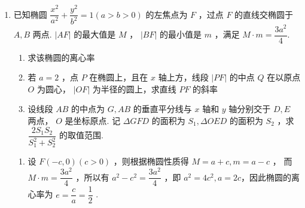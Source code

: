 \begin{enumerate}
\begin{enumerate}
\begin{jieda}
\begin{enumerate}
                以$OP$对$\bigtriangleup  {OGH}$分割可知$\dfrac{S_1}{S_2} = |x_1-x_2|$

                $\left\{\begin{array}{l}
                    y = k(x+1) \\
                    \dfrac{{x}^{2}}{9} + \dfrac{{y}^{2}}{8} = 1
                \end{array}\right.$，消元可得$8x^2+9k^2(x+1)^2 = 72$，即$(8+9k^2)x^2+18k^2x+9k^2-72 = 0$

                $\Delta > 0$，根据韦达定理有$\left\{\begin{array}{l}
                    x_1+x_2 = \dfrac{-18k^2}{8+9k^2} \\
                    x_1x_2 = \dfrac{9k^2-72}{8+9k^2}
                \end{array}\right.$
                
                $\dfrac{S_1}{S_2} = \dfrac{\sqrt{324k^4-4(9k^2-72)(8+9k^2)}}{8+9k^2} = \dfrac{48\sqrt{1+k^2}}{8+9k^2}$
                
                设$t = \sqrt{1+k^2}, t \in (1, 3)$，则$\dfrac{S_1}{S_2} = \dfrac{48t}{9t^2-1} = \dfrac{48}{9t - \dfrac{1}{t}} \in \left(\dfrac{9}{5}, 6\right)$
            \end{enumerate}
        \end{jieda}

        \item 已知椭圆 $\dfrac{x^2}{a^2} + \dfrac{y^2}{b^2} = 1(a > b > 0)$ 的左焦点为 $F$ ，过点 $F$ 的直线交椭圆于 $A,B$ 两点. $|AF|$ 的最大值是 $M$ ， $|BF|$ 的最小值是 $m$ ，满足 $M \cdot m = \dfrac{3a^2}{4}$.
        \begin{enumerate}
            \item 求该椭圆的离心率
            \item 若 $a = 2$ ，点 $P$ 在椭圆上，且在 $x$ 轴上方，线段 $|PF|$ 的中点 $Q$ 在以原点 $O$ 为圆心， $|OF|$ 为半径的圆上，求直线 $PF$ 的斜率
            \item 设线段 $AB$ 的中点为 $G,AB$ 的垂直平分线与 $x$ 轴和 $y$ 轴分别交于 $D,E$ 两点， $O$ 是坐标原点. 记 $\Delta GFD$ 的面积为 $S_1,\Delta OED$ 的面积为 $S_2$ ，求 $\dfrac{2S_{1}S_2}{S_1^2 + S_2^2}$ 的取值范围.
        \end{enumerate}
        \begin{jieda}
            \begin{enumerate}
                \item 设 $F(-c,0) (c > 0)$ ，则根据椭圆性质得 $M = a + c,m = a - c$ ， 而 $M \cdot m = \dfrac{3a^2}{4}$ ，所以有 $a^2 - c^2 = \dfrac{3a^2}{4}$ ，即 $a^2 = 4c^2,a = 2c$，因此椭圆的离心率为 $e = \dfrac{c}{a} = \dfrac{1}{2}$ .
                

\end{enumerate}
\end{jieda}
\end{enumerate}
\end{enumerate}
